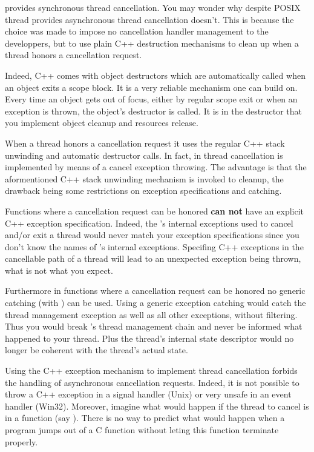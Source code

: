 \lisle provides synchronous thread cancellation. You may wonder why
despite POSIX thread provides asynchronous thread cancellation
\lisle doesn't. This is because the choice was made to impose no
cancellation handler management to the developpers, but to use plain
C++ destruction mechanisms to clean up when a thread honors a
cancellation request.

Indeed, C++ comes with object destructors which are automatically
called when an object exits a scope block. It is a very reliable
mechanism one can build on. Every time an object gets out of focus,
either by regular scope exit or when an exception is thrown, the
object's destructor is called. It is in the destructor that you
implement object cleanup and resources release.

When a \lisle thread honors a cancellation request it uses the
regular C++ stack unwinding and automatic destructor calls. In fact,
in \lisle thread cancellation is implemented by means of a cancel
exception throwing. The advantage is that the aformentioned C++ stack
unwinding mechanism is invoked to cleanup, the drawback being some
restrictions on exception specifications and catching.

Functions where a cancellation request can be honored {\bf can not}
have an explicit C++ exception specification. Indeed, the \lisle's
internal exceptions used to cancel and/or exit a thread would never
match your exception specifications since you don't know the names of
\lisle's internal exceptions. Specifing C++ exceptions in the
cancellable path of a thread will lead to an unexpected exception
being thrown, what is not what you expect.

Furthermore in functions where a cancellation request can be honored
no generic catching (with ) can be used. Using a
generic exception catching would catch the \lisle thread management
exception as well as all other exceptions, without filtering. Thus you
would break \lisle's thread management chain and never be informed
what happened to your thread. Plus the thread's internal state
descriptor would no longer be coherent with the thread's actual state.

Using the C++ exception mechanism to implement thread cancellation
forbids the handling of asynchronous cancellation requests. Indeed, it
is not possible to throw a C++ exception in a signal handler (Unix) or
very unsafe in an event handler (Win32). Moreover, imagine what would
happen if the thread to cancel is in a function (say ).
There is no way to predict what would happen when a program jumps out
of a C function without leting this function terminate properly.

